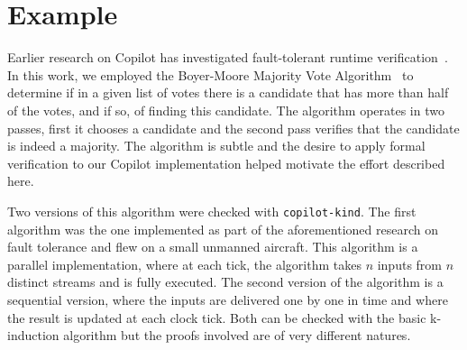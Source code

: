 \section{Example}\label{sec:example}
Earlier research on Copilot  has investigated fault-tolerant
runtime verification~\cite{pike-isse-13}. In this work, we employed the Boyer-Moore
Majority Vote Algorithm~\cite{MooreBoyer82,Hesselink2005} to determine
if in a given list of votes there is a candidate that has more than
half of the votes, and if so, of finding this candidate. The algorithm
operates in two passes, first it chooses a candidate and the second
pass verifies that the candidate is indeed a majority.  The algorithm
is subtle and the desire to apply formal verification to our Copilot
implementation helped motivate the effort described here. 




%



Two versions of this algorithm were checked with
\texttt{copilot-kind}. The first algorithm was the one implemented as
part of the aforementioned research on fault tolerance and flew on a
small unmanned aircraft. This algorithm 
is a parallel implementation, where at each tick, the
algorithm takes $n$ inputs from $n$ distinct streams and is fully
executed. The second version of the algorithm  is a sequential version, where the inputs are
delivered one by one in time and where the result is updated at each
clock tick. Both can be checked with the basic k-induction algorithm
but the proofs involved are of very different natures.


